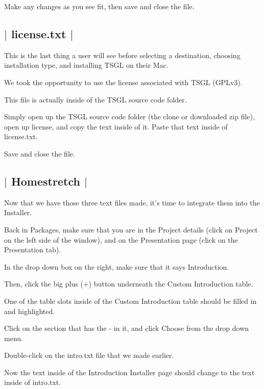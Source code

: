 Make any changes as you see fit, then save and close the file. 

 \subsection*{$\vert$ {\ttfamily license.\-txt} $\vert$ }

This is the last thing a user will see before selecting a destination, choosing installation type, and installing T\-S\-G\-L on their Mac.

We took the opportunity to use the license associated with T\-S\-G\-L (G\-P\-Lv3).

This file is actually inside of the T\-S\-G\-L source code folder.

Simply open up the T\-S\-G\-L source code folder (the clone or downloaded zip file), open up {\ttfamily license}, and copy the text inside of it. Paste that text inside of {\ttfamily license.\-txt}.

Save and close the file. 

 \subsection*{$\vert$ Homestretch $\vert$ }

Now that we have those three text files made, it's time to integrate them into the Installer.

Back in {\ttfamily Packages}, make sure that you are in the {\ttfamily Project} details (click on {\ttfamily Project} on the left side of the window), and on the {\ttfamily Presentation} page (click on the {\ttfamily Presentation} tab).

In the drop down box on the right, make sure that it says {\ttfamily Introduction}.

Then, click the big plus ({\ttfamily +}) button underneath the {\ttfamily Custom Introduction} table.

One of the table slots inside of the {\ttfamily Custom Introduction} table should be filled in and highlighted.

Click on the section that has the {\ttfamily -\/} in it, and click {\ttfamily Choose} from the drop down menu.

Double-\/click on the {\ttfamily intro.\-txt} file that we made earlier.

Now the text inside of the {\ttfamily Introduction} Installer page should change to the text inside of {\ttfamily intro.\-txt}.



